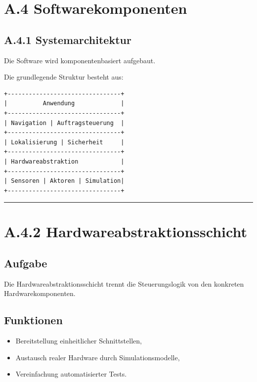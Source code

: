 \documentclass[
  a4paper,
  12pt,
  DIV=12,        %
  parskip=half,  %
  headings=small %
]{scrartcl}
\theoremstyle{definition}
\providecommand{\tightlist}{%
  \setlength{\itemsep}{0pt}\setlength{\parskip}{0pt}}
\theoremstyle{definition}
\providecommand{\tightlist}{%
  \setlength{\itemsep}{0pt}\setlength{\parskip}{0pt}}
\begin{document}
\section{A.4 Softwarekomponenten}\label{a.4-softwarekomponenten}

\subsection{A.4.1 Systemarchitektur}\label{a.4.1-systemarchitektur}

Die Software wird komponentenbasiert aufgebaut.

Die grundlegende Struktur besteht aus:

\begin{verbatim}
+--------------------------------+
|          Anwendung             |
+--------------------------------+
| Navigation | Auftragsteuerung  |
+--------------------------------+
| Lokalisierung | Sicherheit     |
+--------------------------------+
| Hardwareabstraktion            |
+--------------------------------+
| Sensoren | Aktoren | Simulation|
+--------------------------------+
\end{verbatim}

\begin{center}\rule{0.5\linewidth}{0.5pt}\end{center}

\section{A.4.2
Hardwareabstraktionsschicht}\label{a.4.2-hardwareabstraktionsschicht}

\subsection{Aufgabe}\label{aufgabe-6}

Die Hardwareabstraktionsschicht trennt die Steuerungslogik von den
konkreten Hardwarekomponenten.

\subsection{Funktionen}\label{funktionen}

\begin{itemize}
\tightlist
\item
  Bereitstellung einheitlicher Schnittstellen,
\item
  Austausch realer Hardware durch Simulationsmodelle,
\item
  Vereinfachung automatisierter Tests.
\end{itemize}
\end{document}

